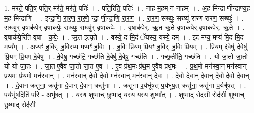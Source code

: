 \documentclass[17pt]{extarticle}
\begin{document}
1. मर॑ते॒ पति॒ष् पति॒र् मर॑ते॒ मर॑ते॒ पतिः॑ । . पति॒रिति॒ पतिः॑ । . नाह म॒हम् न नाहम् । . अ॒ह मि॑न्द्रा णीन्द्राण्य॒ह म॒ह मि॑न्द्राणि । . इ॒न्द्रा॒णि॒ रा॒र॒ण॒ रा॒र॒णे॒ न्द्रा॒ णी॒न्द्रा॒णि॒ रा॒र॒ण॒ । . रा॒र॒ण॒ सख्युः॒ सख्यू॑ रारण रारण॒ सख्युः॑ । . सख्यु॑र् वृ॒षाक॑पेर् वृ॒षाक॑पेः॒ सख्युः॒ सख्यु॑र् वृ॒षाक॑पेः । . वृ॒षाक॑पेर्. ऋ॒त ऋ॒ते वृ॒षाक॑पेर् वृ॒षाक॑पेर्. ऋ॒ते । . वृ॒षाक॑पे॒रिति॑ वृ॒षा - क॒पेः॒ । . ऋ॒त इत्यृ॒ते । . यस्ये॒ द मि॒दं ॅयस्य॒ यस्ये॒ दम् । . इ॒द मप्य॒ मप्य॑ मि॒द मि॒द मप्य᳚म् । . अप्यꣳ॑ ह॒विर्. ह॒विरप्य॒ मप्यꣳ॑ ह॒विः । . ह॒विः प्रि॒यम् प्रि॒यꣳ ह॒विर्. ह॒विः प्रि॒यम् । . प्रि॒यम् दे॒वेषु॑ दे॒वेषु॑ प्रि॒यम् प्रि॒यम् दे॒वेषु॑ । . दे॒वेषु॒ गच्छ॑ति॒ गच्छ॑ति दे॒वेषु॑ दे॒वेषु॒ गच्छ॑ति । . गच्छ॒तीति॒ गच्छ॑ति । . यो जा॒तो जा॒तो यो यो जा॒तः । . जा॒त ए॒वैव जा॒तो जा॒त ए॒व । . ए॒व प्र॑थ॒मः प्र॑थ॒म ए॒वैव प्र॑थ॒मः । . प्र॒थ॒मो मन॑स्वा॒न् मन॑स्वान् प्रथ॒मः प्र॑थ॒मो मन॑स्वान् । . मन॑स्वान् दे॒वो दे॒वो मन॑स्वा॒न् मन॑स्वान् दे॒वः । . दे॒वो दे॒वान् दे॒वान् दे॒वो दे॒वो दे॒वान् । . दे॒वान् क्रतु॑ना॒ क्रतु॑ना दे॒वान् दे॒वान् क्रतु॑ना । . क्रतु॑ना प॒र्यभू॑षत् प॒र्यभू॑ष॒त् क्रतु॑ना॒ क्रतु॑ना प॒र्यभू॑षत् । . प॒र्यभू॑ष॒दिति॑ परि - अभू॑षत् । . यस्य॒ शुष्मा॒च् छुष्मा॒द् यस्य॒ यस्य॒ शुष्मा᳚त् । . शुष्मा॒द् रोद॑सी॒ रोद॑सी॒ शुष्मा॒च् छुष्मा॒द् रोद॑सी । \newline
\end{document}
